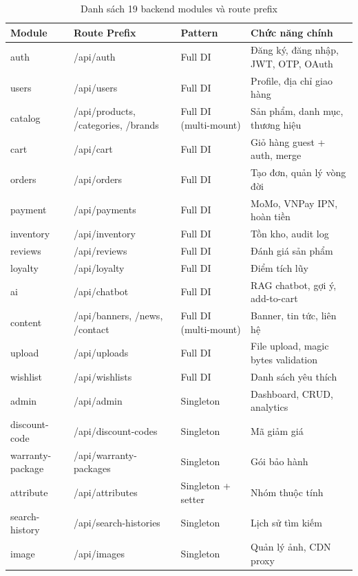 \begin{table}[H]
\centering
\caption{Danh sách 19 backend modules và route prefix}
\begin{tabular}{|l|l|l|p{4cm}|}
\hline
\textbf{Module} & \textbf{Route Prefix} & \textbf{Pattern} & \textbf{Chức năng chính} \\
\hline
auth & /api/auth & Full DI & Đăng ký, đăng nhập, JWT, OTP, OAuth \\
\hline
users & /api/users & Full DI & Profile, địa chỉ giao hàng \\
\hline
catalog & /api/products, /categories, /brands & Full DI (multi-mount) & Sản phẩm, danh mục, thương hiệu \\
\hline
cart & /api/cart & Full DI & Giỏ hàng guest + auth, merge \\
\hline
orders & /api/orders & Full DI & Tạo đơn, quản lý vòng đời \\
\hline
payment & /api/payments & Full DI & MoMo, VNPay IPN, hoàn tiền \\
\hline
inventory & /api/inventory & Full DI & Tồn kho, audit log \\
\hline
reviews & /api/reviews & Full DI & Đánh giá sản phẩm \\
\hline
loyalty & /api/loyalty & Full DI & Điểm tích lũy \\
\hline
ai & /api/chatbot & Full DI & RAG chatbot, gợi ý, add-to-cart \\
\hline
content & /api/banners, /news, /contact & Full DI (multi-mount) & Banner, tin tức, liên hệ \\
\hline
upload & /api/uploads & Full DI & File upload, magic bytes validation \\
\hline
wishlist & /api/wishlists & Full DI & Danh sách yêu thích \\
\hline
admin & /api/admin & Singleton & Dashboard, CRUD, analytics \\
\hline
discount-code & /api/discount-codes & Singleton & Mã giảm giá \\
\hline
warranty-package & /api/warranty-packages & Singleton & Gói bảo hành \\
\hline
attribute & /api/attributes & Singleton + setter & Nhóm thuộc tính \\
\hline
search-history & /api/search-histories & Singleton & Lịch sử tìm kiếm \\
\hline
image & /api/images & Singleton & Quản lý ảnh, CDN proxy \\
\hline
\end{tabular}
\end{table}

